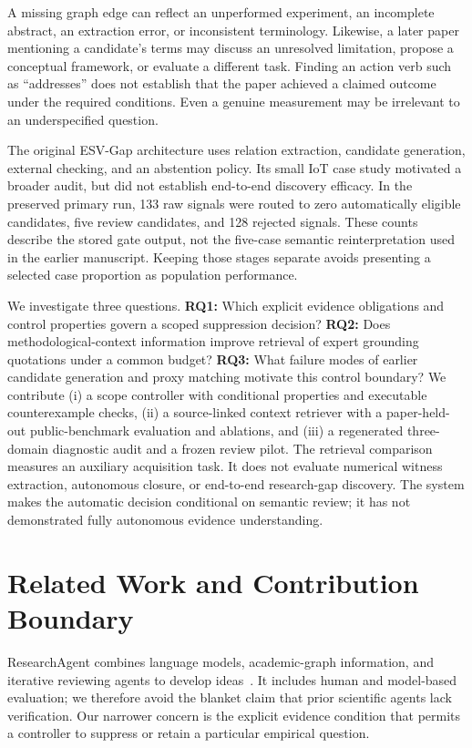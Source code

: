 \documentclass[runningheads]{llncs}
\newcommand{\method}{ESV-Gap}
\begin{document}
A missing graph edge can reflect an unperformed experiment, an incomplete abstract, an extraction error, or inconsistent terminology. Likewise, a later paper mentioning a candidate's terms may discuss an unresolved limitation, propose a conceptual framework, or evaluate a different task. Finding an action verb such as ``addresses'' does not establish that the paper achieved a claimed outcome under the required conditions. Even a genuine measurement may be irrelevant to an underspecified question.

The original \method{} architecture uses relation extraction, candidate generation, external checking, and an abstention policy. Its small IoT case study motivated a broader audit, but did not establish end-to-end discovery efficacy. In the preserved primary run, 133 raw signals were routed to zero automatically eligible candidates, five review candidates, and 128 rejected signals. These counts describe the stored gate output, not the five-case semantic reinterpretation used in the earlier manuscript. Keeping those stages separate avoids presenting a selected case proportion as population performance.

We investigate three questions. \textbf{RQ1:} Which explicit evidence obligations and control properties govern a scoped suppression decision? \textbf{RQ2:} Does methodological-context information improve retrieval of expert grounding quotations under a common budget? \textbf{RQ3:} What failure modes of earlier candidate generation and proxy matching motivate this control boundary? We contribute (i) a scope controller with conditional properties and executable counterexample checks, (ii) a source-linked context retriever with a paper-held-out public-benchmark evaluation and ablations, and (iii) a regenerated three-domain diagnostic audit and a frozen review pilot. The retrieval comparison measures an auxiliary acquisition task. It does not evaluate numerical witness extraction, autonomous closure, or end-to-end research-gap discovery. The system makes the automatic decision conditional on semantic review; it has not demonstrated fully autonomous evidence understanding.

\section{Related Work and Contribution Boundary}
ResearchAgent combines language models, academic-graph information, and iterative reviewing agents to develop ideas~\cite{baek2025}. It includes human and model-based evaluation; we therefore avoid the blanket claim that prior scientific agents lack verification. Our narrower concern is the explicit evidence condition that permits a controller to suppress or retain a particular empirical question.
\end{document}

